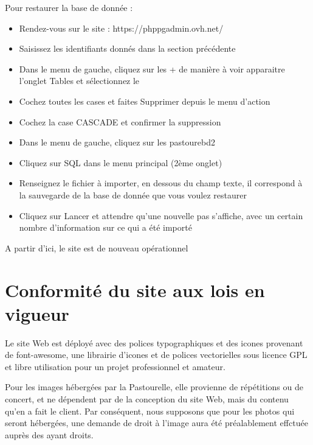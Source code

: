 \documentclass[11pt]{report}
\begin{document}
\par Pour restaurer la base de donnée : 
\begin{itemize}
  \item Rendez-vous sur le site : https://phppgadmin.ovh.net/
  \item Saisissez les identifiants donnés dans la section précédente
  \item Dans le menu de gauche, cliquez sur les \og + \fg{} de manière à voir
  apparaitre l'onglet \og Tables \fg{} et sélectionnez le
  \item Cochez toutes les cases et faites \og Supprimer \fg{} depuis le menu
  d'action
  \item Cochez la case \og CASCADE \fg{} et confirmer la suppression
  \item  Dans le menu de gauche, cliquez sur les \og pastourebd2 \fg{}
  \item Cliquez sur \og SQL \fg{} dans le menu principal (2ème onglet)
  \item Renseignez le fichier à importer, en dessous du champ texte, il
  correspond à la sauvegarde de la base de donnée que vous voulez restaurer
  \item Cliquez sur \og Lancer \fg{} et attendre qu'une nouvelle pas s'affiche,
  avec un certain nombre d'information sur ce qui a été importé \\
\end{itemize}

\par A partir d'ici, le site est de nouveau opérationnel

\section{Conformité du site aux lois en vigueur}
Le site Web est déployé avec des polices typographiques et des icones provenant
de font-awesome, une librairie d'icones et de polices vectorielles sous licence
GPL et libre utilisation pour un projet professionnel et amateur. \\

\par Pour les images hébergées par la Pastourelle, elle provienne de répétitions
ou de concert, et ne dépendent par de la conception du site Web, mais du contenu
qu'en a fait le client. Par conséquent, nous supposons que pour les photos qui
seront hébergées, une demande de droit à l'image aura été préalablement effctuée
auprès des ayant droits. \\
\end{document}
